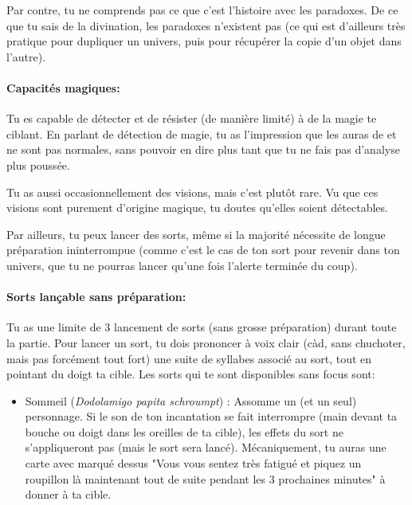 {	\par Par contre, tu ne comprends pas ce que c'est l'histoire avec les paradoxes. De ce que tu sais de la divination, les paradoxes n'existent pas (ce qui est d'ailleurs très pratique pour dupliquer un univers, puis pour récupérer la copie d'un objet dans l'autre).
	
	
	\paragraph{Capacités magiques:} Tu es capable de détecter et de résister (de manière limité) à de la magie te ciblant. En parlant de détection de magie, tu as l'impression que les auras de \nmPlayerXI et \nmPlayerIX ne sont pas normales, sans pouvoir en dire plus tant que tu ne fais pas d'analyse plus poussée.
	
	\par Tu as aussi occasionnellement des visions, mais c'est plutôt rare. Vu que ces visions sont purement d'origine magique, tu doutes qu'elles soient détectables.
	
	\par Par ailleurs, tu peux lancer des sorts, même si la majorité nécessite de longue préparation ininterrompue (comme c'est le cas de ton sort pour revenir dans ton univers, que tu ne pourras lancer qu'une fois l'alerte terminée du coup). 
	
	\paragraph{Sorts lançable sans préparation:} Tu as une limite de 3 lancement de sorts (sans grosse préparation) durant toute la partie. Pour lancer un sort, tu dois prononcer à voix clair (càd, sans chuchoter, mais pas forcément tout fort) une suite de syllabes associé au sort, tout en pointant du doigt ta cible. Les sorts qui te sont disponibles sans focus sont:
	\begin{itemize}
		\item Sommeil (\emph{Dodolamigo papita schroumpt}) : Assomme un (et un seul) personnage. Si le son de ton incantation se fait interrompre (main devant ta bouche ou doigt dans les oreilles de ta cible), les effets du sort ne s'appliqueront pas (mais le sort sera lancé). Mécaniquement, tu auras une carte avec marqué dessus "Vous vous sentez très fatigué et piquez un roupillon là maintenant tout de suite pendant les 3 prochaines minutes" à donner à ta cible.
		

\end{itemize}}
